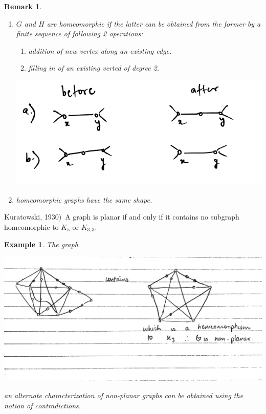 \documentclass[12pt]{article}
\newenvironment{theorem}[1]{%
  \renewcommand\themanualtheoreminner{#1}%
  \manualtheoreminner
}{\endmanualtheoreminner}
\newtheorem{example}{Example}
\newtheorem*{remark}{Remark}
\begin{document}
\begin{remark}\

	\begin{enumerate}
		\item $G$ and $H$ are homeomorphic if the latter can be obtained from the former by a finite sequence of following 2 operations:
		      \begin{enumerate}
			      \item addition of new vertex along an existing edge.
			      \item filling in of an existing verted of degree 2.
		      \end{enumerate}

		      \begin{center}
			      \includegraphics[scale=0.5]{remarkgraph}
		      \end{center}
		\item homeomorphic graphs have the same shape.
	\end{enumerate}
\end{remark}



\begin{theorem}{5} (Kuratowski, 1930)\
	A graph is planar if and only if it contains no subgraph homeomorphic to $K_{5}$ or $K_{3,3}$.
\end{theorem}


\begin{example}
	The graph
	\begin{center}
		\includegraphics[scale=0.2]{petersan}
	\end{center}



	an alternate characterization of non-planar graphs can be obtained using the notion of contradictions.
\end{example}
\end{document}
